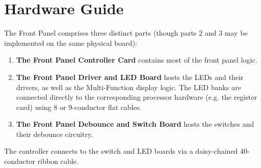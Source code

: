 \documentclass[11pt,a4paper,twocolumns]{article}
\begin{document}
\section{Hardware Guide}

The Front Panel comprises three distinct parts (though parts 2 and 3
may be implemented on the same physical board):

\begin{enumerate}
\item{\bf The Front Panel Controller Card} contains most of the front
  panel logic.
\item{\bf The Front Panel Driver and LED Board} hosts the LEDs and
  their drivers, as well as the Multi-Function display logic. The LED
  banks are connected directly to the corresponding processor hardware
  (e.g. the register card) using 8 or 9-conductor flat cables.
\item{\bf The Front Panel Debounce and Switch Board} hosts the switches
  and their debounce circuitry.
\end{enumerate}

The controller connects to the switch and LED boards via a
daisy-chained 40-conductor ribbon cable.
\end{document}
